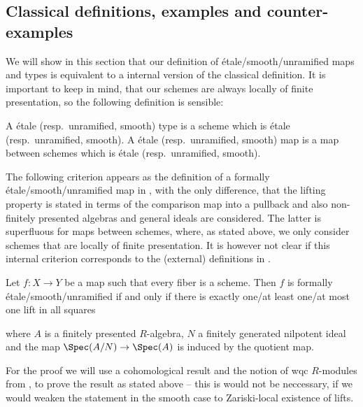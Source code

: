 \subsection{Classical definitions, examples and counter-examples}

We will show in this section that our definition of étale/smooth/unramified maps and types is equivalent to a internal version of the classical definition. It is important to keep in mind, that our schemes are always locally of finite presentation, so the following definition is sensible:

\begin{definition}
  A étale (resp.\ unramified, smooth) type is a scheme which is étale (resp.\ unramified, smooth).
  A étale (resp.\ unramified, smooth) map is a map between schemes which is étale (resp.\ unramified, smooth).
\end{definition}

The following criterion appears as the definition of a formally étale/smooth/unramified map in \cite[§17]{EGAIV4},
with the only difference, that the lifting property is stated in terms of the comparison map into a pullback and also non-finitely presented algebras and general ideals are considered. The latter is superfluous for maps between schemes, where, as stated above, we only consider schemes that are locally of finite presentation. It is however not clear if this internal criterion corresponds to the (external) definitions in \cite[§17]{EGAIV4}.

\begin{remark}
  \label{connection-to-ega-definition}
  Let $f:X\to Y$ be a map such that every fiber is a scheme.
  Then $f$ is formally étale/smooth/unramified if and only if there is exactly one/at least one/at most one lift in all squares
  \begin{center}
  \end{center}
where $A$ is a finitely presented $R$-algebra, $N$ a finitely generated nilpotent ideal and the map $\Spec(A/N)\to\Spec(A)$ is induced by the quotient map.
\end{remark}

For the proof we will use a cohomological result and the notion of wqc $R$-modules from \cite{draft},
to prove the result as stated above -- this is would not be neccessary, if we would weaken the statement in the smooth case to Zariski-local existence of lifts.

